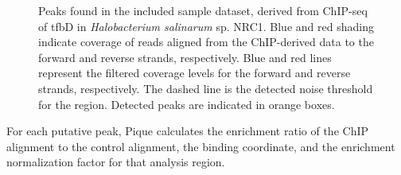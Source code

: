 \documentclass{bioinfo}
\begin{document}
\begin{methods}
\begin{figure}[!tfbd data - reasonable spot showing curation]%
  \begin{center}
    {}
    {}
  \end{center}
  \caption{Peaks found in the included sample dataset, derived from
    ChIP-seq of tfbD in {\em Halobacterium salinarum} sp. NRC1. Blue
    and red shading indicate coverage of reads aligned from the
    ChIP-derived data to the forward and reverse strands,
    respectively. Blue and red lines represent the filtered coverage
    levels for the forward and reverse strands, respectively. The
    dashed line is the detected noise threshold for the
    region. Detected peaks are indicated in orange
    boxes.}\label{fig:02}
\end{figure}

\noindent For each putative peak, Pique calculates the enrichment
ratio of the ChIP alignment to the control alignment, the binding
coordinate, and the enrichment normalization factor for that analysis
region. 

\end{methods}

\end{document}
